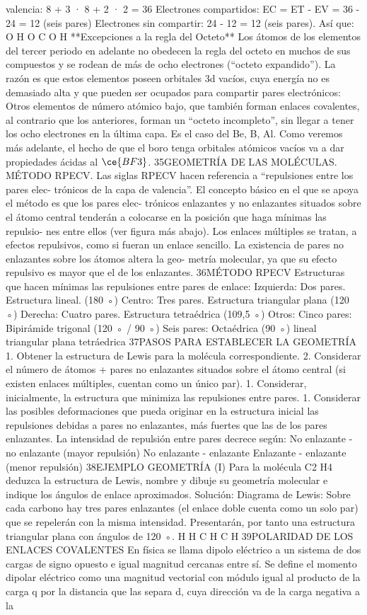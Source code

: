 \documentclass[tikz,border=2mm]{standalone}
\begin{document}
valencia: 8 + 3 · 8 + 2 · 2 = 36 Electrones compartidos: EC = ET - EV = 36 - 24 = 12 (seis pares) Electrones sin compartir: 24 - 12 = 12 (seis pares). Así que: O H O C O H **Excepciones a la regla del Octeto** Los átomos de los elementos del tercer periodo en adelante no obedecen la regla del octeto en muchos de sus compuestos y se rodean de más de ocho electrones (“octeto expandido”). La razón es que estos elementos poseen orbitales 3d vacíos, cuya energía no es demasiado alta y que pueden ser ocupados para compartir pares electrónicos: Otros elementos de número atómico bajo, que también forman enlaces covalentes, al contrario que los anteriores, forman un “octeto incompleto”, sin llegar a tener los ocho electrones en la última capa. Es el caso del Be, B, Al. Como veremos más adelante, el hecho de que el boro tenga orbitales atómicos vacíos va a dar propiedades ácidas al $\ce{BF3}$. 35GEOMETRÍA DE LAS MOLÉCULAS. MÉTODO RPECV. Las siglas RPECV hacen referencia a “repulsiones entre los pares elec- trónicos de la capa de valencia”. El concepto básico en el que se apoya el método es que los pares elec- trónicos enlazantes y no enlazantes situados sobre el átomo central tenderán a colocarse en la posición que haga mínimas las repulsio- nes entre ellos (ver figura más abajo). Los enlaces múltiples se tratan, a efectos repulsivos, como si fueran un enlace sencillo. La existencia de pares no enlazantes sobre los átomos altera la geo- metría molecular, ya que su efecto repulsivo es mayor que el de los enlazantes. 36MÉTODO RPECV Estructuras que hacen mínimas las repulsiones entre pares de enlace: Izquierda: Dos pares. Estructura lineal. (180 ◦) Centro: Tres pares. Estructura triangular plana (120 ◦) Derecha: Cuatro pares. Estructura tetraédrica (109,5 ◦) Otros: Cinco pares: Bipirámide trigonal (120 ◦ / 90 ◦) Seis pares: Octaédrica (90 ◦) lineal triangular plana tetráedrica 37PASOS PARA ESTABLECER LA GEOMETRÍA 1. Obtener la estructura de Lewis para la molécula correspondiente. 2. Considerar el número de átomos + pares no enlazantes situados sobre el átomo central (si existen enlaces múltiples, cuentan como un único par). 1. Considerar, inicialmente, la estructura que minimiza las repulsiones entre pares. 1. Considerar las posibles deformaciones que pueda originar en la estructura inicial las repulsiones debidas a pares no enlazantes, más fuertes que las de los pares enlazantes. La intensidad de repulsión entre pares decrece según: No enlazante - no enlazante (mayor repulsión) No enlazante - enlazante Enlazante - enlazante (menor repulsión) 38EJEMPLO GEOMETRÍA (I) Para la molécula C2 H4 deduzca la estructura de Lewis, nombre y dibuje su geometría molecular e indique los ángulos de enlace aproximados. Solución: Diagrama de Lewis: Sobre cada carbono hay tres pares enlazantes (el enlace doble cuenta como un solo par) que se repelerán con la misma intensidad. Presentarán, por tanto una estructura triangular plana con ángulos de 120 ◦. H H C H C H 39POLARIDAD DE LOS ENLACES COVALENTES En física se llama dipolo eléctrico a un sistema de dos cargas de signo opuesto e igual magnitud cercanas entre sí. Se define el momento dipolar eléctrico como una magnitud vectorial con módulo igual al producto de la carga q por la distancia que las separa d, cuya dirección va de la carga negativa a la 
\end{document}
